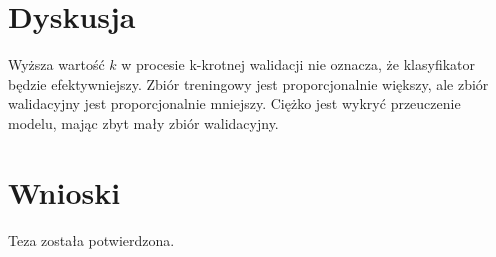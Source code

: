 \documentclass[12pt,a4paper]{article}
\begin{document}
\section*{Dyskusja}
Wyższa wartość $k$ w procesie k-krotnej walidacji nie oznacza, że klasyfikator będzie efektywniejszy. Zbiór treningowy jest proporcjonalnie większy, ale zbiór walidacyjny jest proporcjonalnie mniejszy. Ciężko jest wykryć przeuczenie modelu, mając zbyt mały zbiór walidacyjny.

\section*{Wnioski}
Teza została potwierdzona.

\nocite{*}

{}
\end{document}

